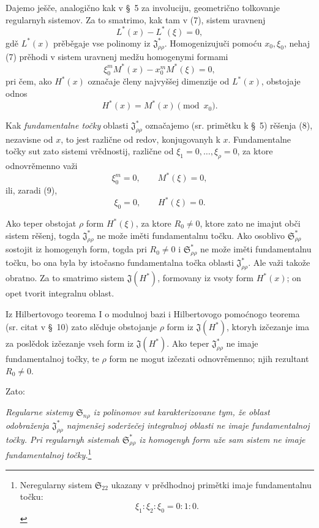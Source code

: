 \documentclass[11pt]{article}
\providecommand{\Ssys}{\mathfrak{S}}
\providecommand{\Jdom}{\mathfrak{J}}
\begin{document}
Dajemo ješče, analogično kak v \S\ 5 za involuciju, geometrično tolkovanje regularnyh sistemov. Za to smatrimo, kak tam v (7), sistem uravnenj
\begin{equation}
  L^*(x)-L^*(\xi)=0,
\tag{7}
\end{equation}
gdě $L^*(x)$ prěběgaje vse polinomy iz $\Jdom^*_{\rho\rho}$. Homogenizujuči pomoću $x_0,\xi_0$, nehaj (7) prěhodi v sistem uravnenj medžu homogenymi formami
\begin{equation}
  \xi_0^{m}M^*(x)-x_0^{m}M^*(\xi)=0,
\tag{8}
\end{equation}
pri čem, ako $H^*(x)$ označaje členy najvyššej dimenzije od $L^*(x)$, obstojaje odnos
\begin{equation}
  H^*(x)=M^*(x)\pmod{x_0}.
\tag{9}
\end{equation}

Kak {\itshape fundamentalne točky} oblasti $\Jdom^*_{\rho\rho}$ označajemo (sr. primětku k \S\ 5) rěšenja (8), nezavisne od $x$, to jest različne od redov, konjugovanyh k $x$. Fundamentalne točky sut zato sistemi vrědnostij, različne od $\xi_1=0,\ldots,\xi_\rho=0$, za ktore odnovrěmenno važi
\[
  \xi_0^m=0,\qquad M^*(\xi)=0,
\]
ili, zaradi (9),
\[
  \xi_0=0,
  \qquad H^*(\xi)=0.
\]

Ako teper obstojat $\rho$ form $H^*(\xi)$, za ktore $R_0\ne0$, ktore zato ne imajut obči sistem rěšenj, togda $\Jdom^*_{\rho\rho}$ ne može iměti fundamentalnu točku. Ako osoblivo $\Ssys^*_{\rho\rho}$ sostojit iz homogenyh form, togda pri $R_0\ne0$ i $\Ssys^*_{\rho\rho}$ ne može iměti fundamentalnu točku, bo ona byla by istočasno fundamentalna točka oblasti $\Jdom^*_{\rho\rho}$. Ale važi takože obratno. Za to smatrimo sistem $\Jdom(H^*)$, formovany iz vsoty form $H^*(x)$; on opet tvorit integralnu oblast.

Iz Hilbertovogo teorema I o modulnoj bazi i Hilbertovogo pomoćnogo teorema (sr. citat v \S\ 10) zato slěduje obstojanje $\rho$ form iz $\Jdom(H^*)$, ktoryh izčezanje ima za poslědok izčezanje vseh form iz $\Jdom(H^*)$. Ako teper $\Jdom^*_{\rho\rho}$ ne imaje fundamentalnoj točky, te $\rho$ form ne mogut izčezati odnovrěmenno; njih rezultant $R_0\ne0$.

Zato:

{\itshape Regularne sistemy $\Ssys_{n\rho}$ iz polinomov sut karakterizovane tym, že oblast odobraženja $\Jdom^*_{\rho\rho}$ najmenšej soderžečej integralnoj oblasti ne imaje fundamentalnoj točky. Pri regularnyh sistemah $\Ssys^*_{\rho\rho}$ iz homogenyh form uže sam sistem ne imaje fundamentalnoj točky.}\footnote{Neregularny sistem $\Ssys_{22}$ ukazany v prědhodnoj primětki imaje fundamentalnu točku:
\[
  \xi_1:\xi_2:\xi_0=0:1:0.
\]}
\end{document}
